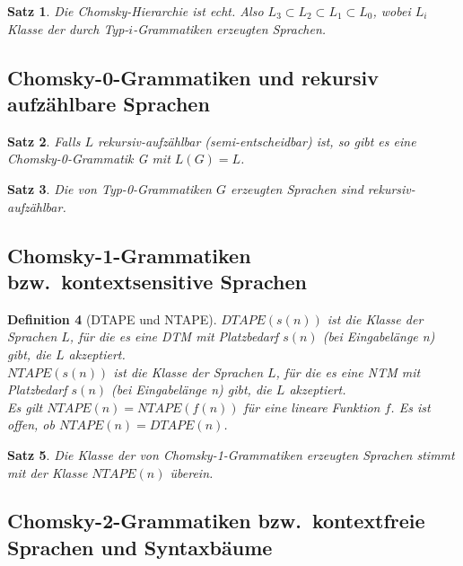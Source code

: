 \documentclass[11pt]{scrartcl}
\theoremstyle{break}
\newtheorem{satz}{Satz}[section]
\newtheorem{defi}[satz]{Definition}
\begin{document}
    \begin{satz}
        Die Chomsky-Hierarchie ist echt.
        Also $L_3\subset L_2\subset L_1\subset L_0$, wobei $L_i$ Klasse der durch Typ-$i$-Grammatiken erzeugten Sprachen.
    \end{satz}


    \subsection{Chomsky-0-Grammatiken und rekursiv aufzählbare Sprachen}
	\label{subsec:chomsky-0-grammatiken-und-rekursiv-aufzählbare-sprachen}

    \begin{satz}
        Falls $L$ rekursiv-aufzählbar (semi-entscheidbar) ist, so gibt es eine Chomsky-0-Grammatik G mit $L(G)=L$.
    \end{satz}

    \begin{satz}
        Die von Typ-0-Grammatiken $G$ erzeugten Sprachen sind rekursiv-aufzählbar.
    \end{satz}


    \subsection{Chomsky-1-Grammatiken bzw.\ kontextsensitive Sprachen}
	\label{subsec:chomsky-1-grammatiken-bzw.-kontextsensitive-sprachen}

    \begin{defi}[DTAPE und NTAPE]
        $DTAPE(s(n))$ ist die Klasse der Sprachen $L$, für die es eine DTM mit Platzbedarf $s(n)$ (bei Eingabelänge n) gibt, die $L$ akzeptiert.\\
        $NTAPE(s(n))$ ist die Klasse der Sprachen $L$, für die es eine NTM mit Platzbedarf $s(n)$ (bei Eingabelänge n) gibt, die $L$ akzeptiert.\\
        Es gilt $NTAPE(n)=NTAPE(f(n))$ für eine lineare Funktion $f$.
        Es ist offen, ob $NTAPE(n)=DTAPE(n)$.
    \end{defi}

    \begin{satz}
        Die Klasse der von Chomsky-1-Grammatiken erzeugten Sprachen stimmt mit der Klasse $NTAPE(n)$ überein.
    \end{satz}


    \subsection{Chomsky-2-Grammatiken bzw.\ kontextfreie Sprachen und Syntaxbäume}
	\label{subsec:chomsky-2-grammatiken-bzw.-kontextfreie-sprachen-und-syntaxbäume}
\end{document}
